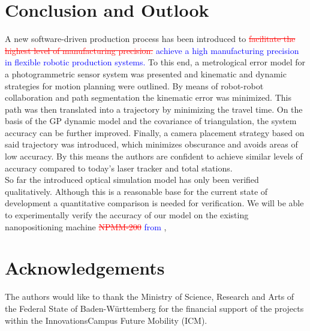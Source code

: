\documentclass[5p,times,procedia]{elsarticle}
\newcommand{\rem}[1]{\textcolor{red}{\sout{#1}}}
\newcommand{\prop}[1]{\textcolor{blue}{#1}}
\begin{document}
%
%
\section{Conclusion and Outlook}
%
A new software-driven production process has been introduced to \rem{facilitate the highest level of manufacturing precision.}
\prop{achieve a high manufacturing precision in flexible robotic production systems.}
To this end, a metrological error model for a photogrammetric sensor system was presented and kinematic and dynamic strategies for motion planning were outlined. By means of robot-robot collaboration and path segmentation the kinematic error was minimized. This path was then translated into a trajectory by minimizing the travel time. On the basis of the GP dynamic model and the covariance of triangulation, the system accuracy can be further improved. Finally, a camera placement strategy based on said trajectory was introduced, which minimizes obscurance and avoids areas of low accuracy. By this means the authors are confident to achieve similar levels of accuracy compared to today's laser tracker and total stations.\\
So far the introduced optical simulation model has only been verified qualitatively. Although this is a reasonable base for the current state of development a quantitative comparison is needed for verification. 
We will be able to experimentally verify the accuracy of our model on the existing nanopositioning machine \rem{NPMM-200} \prop{from} \cite{Jaeger2016}, 
%
\section*{Acknowledgements}
The authors would like to thank the Ministry of Science, Research and Arts of the Federal State of Baden-Württemberg for the financial support of the projects within the InnovationsCampus Future Mobility (ICM).
%


%
\clearpage\onecolumn
%
\normalMode
%
\end{document}

